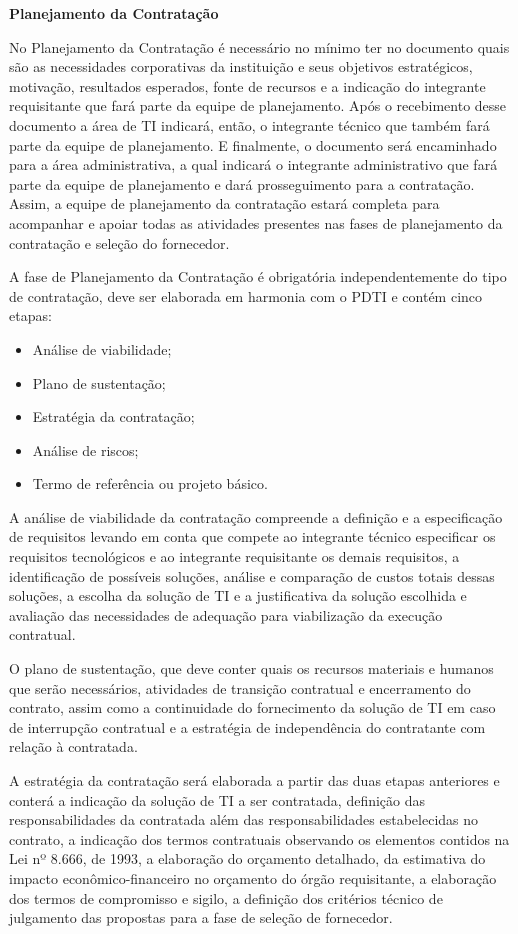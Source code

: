 \textbf {Planejamento da Contratação}

No Planejamento da Contratação é necessário no mínimo ter no documento quais são as necessidades corporativas da instituição e seus objetivos estratégicos, motivação, resultados esperados, fonte de recursos e a indicação do integrante requisitante que fará parte da equipe de planejamento.  Após o recebimento desse documento a área de TI indicará, então, o integrante técnico que também fará parte da equipe de planejamento. E finalmente, o documento será encaminhado para a área administrativa, a qual indicará o integrante administrativo que fará parte da equipe de planejamento e dará prosseguimento para a contratação. Assim, a equipe de planejamento da contratação estará completa para acompanhar e apoiar todas as atividades presentes nas fases de planejamento da contratação e seleção do fornecedor.

A fase de Planejamento da Contratação é obrigatória independentemente do tipo de contratação, deve ser elaborada em harmonia com o PDTI e contém cinco etapas: 
\begin{itemize}
\item Análise de viabilidade; 
\item Plano de sustentação; 
\item Estratégia da contratação; 
\item Análise de riscos; 
\item Termo de referência ou projeto básico.
\end{itemize}

A análise de viabilidade da contratação compreende a definição e a especificação de requisitos levando em conta que compete ao integrante técnico especificar os requisitos tecnológicos e ao integrante requisitante os demais requisitos, a identificação de possíveis soluções, análise e comparação de custos totais dessas soluções, a escolha da solução de TI e a justificativa da solução escolhida e avaliação das necessidades de adequação para viabilização da execução contratual. 

O plano de sustentação, que deve conter quais os recursos materiais e humanos que serão necessários, atividades de transição contratual e encerramento do contrato, assim como a continuidade do fornecimento da solução de TI em caso de interrupção contratual e a estratégia de independência do contratante com relação à contratada. 

A estratégia da contratação será elaborada a partir das duas etapas anteriores e conterá a indicação da solução de TI a ser contratada, definição das responsabilidades da contratada além das responsabilidades estabelecidas no contrato, a indicação dos termos contratuais observando os elementos contidos na Lei nº 8.666, de 1993, a elaboração do orçamento detalhado, da estimativa do impacto econômico-financeiro no orçamento do órgão requisitante, a elaboração dos termos de compromisso e sigilo, a definição dos critérios técnico de julgamento das propostas para a fase de seleção de fornecedor. 

